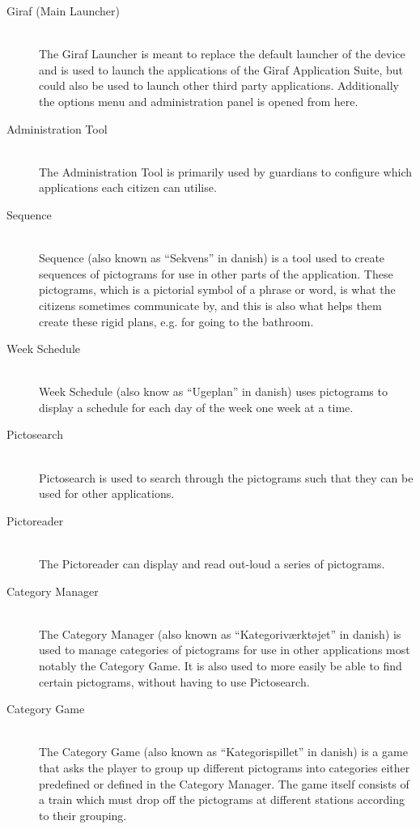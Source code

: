 \begin{description}
	\item[Giraf (Main Launcher)]\hfill \\
	The Giraf Launcher is meant to replace the default launcher of the device and is used to launch the applications of the Giraf Application Suite, but could also be used to launch other third party applications.
	Additionally the options menu and administration panel is opened from here. 
	\item[Administration Tool]\hfill \\
	The Administration Tool is primarily used by guardians to configure which applications each citizen can utilise. 
	\item[Sequence] \hfill \\
	Sequence (also known as ``Sekvens'' in danish) is a tool used to create sequences of pictograms for use in other parts of the application.
	These pictograms, which is a pictorial symbol of a phrase or word, is what the citizens sometimes communicate by, and this is also what helps them create these rigid plans, e.g. for going to the bathroom. 
	\item[Week Schedule] \hfill \\
	Week Schedule (also know as ``Ugeplan'' in danish) uses pictograms to display a schedule for each day of the week one week at a time. 
	\item[Pictosearch] \hfill \\
	Pictosearch is used to search through the pictograms such that they can be used for other applications. 
	\item[Pictoreader] \hfill \\
	The Pictoreader can display and read out-loud a series of pictograms. 
	\item[Category Manager] \hfill \\
	The Category Manager (also known as ``Kategoriværktøjet'' in danish) is used to manage categories of pictograms for use in other applications most notably the Category Game.
	It is also used to more easily be able to find certain pictograms, without having to use Pictosearch.
	\item[Category Game] \hfill \\
	The Category Game (also known as ``Kategorispillet'' in danish) is a game that asks the player to group up different pictograms into categories either predefined or defined in the Category Manager. 
	The game itself consists of a train which must drop off the pictograms at different stations according to their grouping.

\end{description}
